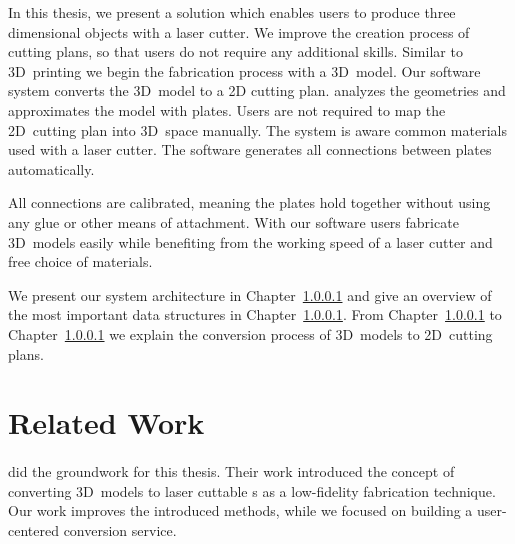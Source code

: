\documentclass[../ClassicThesis.tex]{subfiles}
\begin{document}

In this thesis, we present a solution which enables users to
produce three dimensional objects with a laser cutter. We
improve the creation process of cutting plans, so that users
do not require any additional skills. Similar to 3D~printing
we begin the fabrication process with a 3D~model.
Our software system {\platener} converts the 3D~model to a
2D cutting plan. {\platener} analyzes the geometries and
approximates the model with plates. Users are not required
to map the 2D~cutting plan into 3D~space manually.
The system is aware common materials used with a laser cutter. The software generates all connections between plates automatically.

All connections are calibrated, meaning the plates hold
together without using any glue or other means of
attachment. With our software users fabricate 3D~models
easily while benefiting from the working speed of a laser
cutter and free choice of materials.




We present our system architecture in Chapter~\ref{} and give an
overview of the most important data structures in Chapter~\ref{}. From
Chapter~\ref{} to Chapter~\ref{} we explain the conversion process of
3D~models to 2D~cutting plans.

\section{Related Work}
\label{sec:related-work}

\paragraph{{\platener}} \citeauthor{master-thesis} did the groundwork
for this thesis. Their work introduced the concept of converting
3D~models to laser cuttable {\svgfile}s as a low-fidelity fabrication
technique. Our work improves the introduced methods, while we focused
on building a user-centered conversion service.
\end{document}
